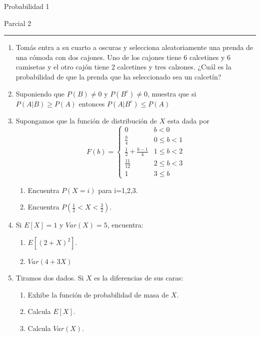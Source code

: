 \documentclass[12pt]{report}
\begin{document}
\begin{center}
    \textsf{\Large Probabilidad 1}
    \par\medskip
    \textsf{\large Parcial 2}
\end{center}
\hrule
\par\bigskip

\begin{enumerate}
    \item Tomás entra a su cuarto a oscuras y selecciona aleatoriamente una prenda de una cómoda con dos cajones. Uno de los cajones tiene 6 calcetines y 6 camisetas y el otro cajón tiene 2 calcetines y tres calzones. ¿Cuál es la probabilidad de que la prenda que ha seleccionado sea un calcetín?
    \item Suponiendo que $P(B)\neq 0$ y $P(B^c)\neq 0$, muestra que si $P(A\vert B) \geq P(A)$ entonces $P(A\vert B^c) \leq P(A)$
    \item Supongamos que la función de distribución de $X$ esta dada por
          \begin{equation*}
              F(b)=
              \begin{cases}
                  0                         & b < 0      \\
                  \frac{b}{4}               & 0\leq b <1 \\
                  \frac{1}{2}+\frac{b-1}{4} & 1\leq b <2 \\
                  \frac{11}{12}             & 2\leq b <3 \\
                  1                         & 3\leq b
              \end{cases}
          \end{equation*}
          \begin{enumerate}
              \item Encuentra $P\left(X=i\right)$ para i=1,2,3.
              \item Encuentra $P\left(\frac{1}{2}<X<\frac{3}{2}\right)$.
          \end{enumerate}
    \item Si $E\left[X\right]=1$ y $Var\left(X\right)=5$, encuentra:
          \begin{enumerate}
              \item $E\left[(2+X)^2\right]$.
              \item $Var\left(4+3X\right)$
          \end{enumerate}
    \item Tiramos dos dados. Si $X$ es la diferencias de sus caras:
          \begin{enumerate}
              \item Exhibe la función de probabilidad de masa de $X$.
              \item Calcula $E\left[X\right]$.
              \item Calcula $Var\left(X\right)$.
          \end{enumerate}
\end{enumerate}
\end{document}
